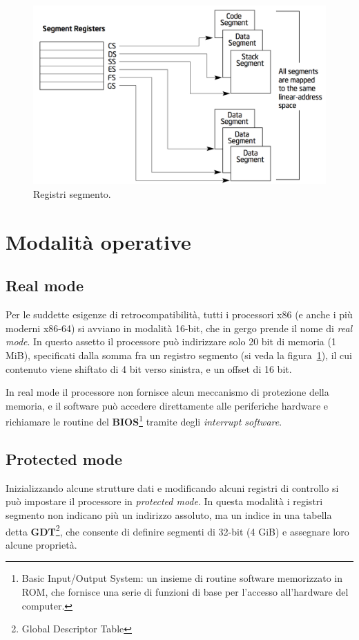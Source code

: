 \documentclass[12pt,a4paper]{report}
\begin{document}
		\begin{figure}[b!]
		\centering
		\includegraphics[scale=0.6]{img/segment.png}
		\caption{Registri segmento. \cite{Intel}\label{fig:segment}}
		\end{figure}

	\section{Modalità operative}
		\subsection{Real mode}
			Per le suddette esigenze di retrocompatibilità, tutti i processori x86 (e anche i più moderni x86-64) si avviano
			in modalità 16-bit, che in gergo prende il nome di \emph{real mode}.
			In questo assetto il processore può indirizzare solo 20 bit di memoria (1 MiB), specificati dalla somma fra
			un registro segmento (si veda la figura~\ref{fig:segment}), il cui contenuto viene shiftato di 4 bit verso sinistra,
			e un offset di 16 bit.
		
			In real mode il processore non fornisce alcun meccanismo di protezione della memoria, e il software può
			accedere direttamente alle periferiche hardware e richiamare le routine del \textbf{BIOS}\footnote{Basic Input/Output System:
			un insieme di routine software memorizzato in ROM, che fornisce una serie di funzioni di base per l'accesso all'hardware del computer.}
			tramite degli \emph{interrupt software}.
		
		\subsection{Protected mode}
			Inizializzando alcune strutture dati e modificando alcuni registri di controllo si può impostare il processore
			in \emph{protected mode}. In questa modalità i registri segmento non indicano più un indirizzo assoluto,
			ma un indice in una tabella detta \textbf{GDT}\footnote{Global Descriptor Table}, che consente di definire
			segmenti di 32-bit (4 GiB) e assegnare loro alcune proprietà.
			
\end{document}
